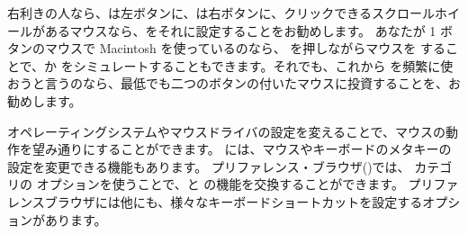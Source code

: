 \documentclass[a4paper,10pt,twoside]{book}
\begin{document}





右利きの人なら、\click は左ボタンに、\actclick は右ボタンに、クリックできるスクロールホイールがあるマウスなら、\metaclick をそれに設定することをお勧めします。
あなたが 1 ボタンのマウスで Macintosh を使っているのなら、\clover{} を押しながらマウスを \click することで、\actclick か \metaclick をシミュレートすることもできます。それでも、これから \pharo を頻繁に使おうと言うのなら、最低でも二つのボタンの付いたマウスに投資することを、お勧めします。

オペレーティングシステムやマウスドライバの設定を変えることで、マウスの動作を望み通りにすることができます。
\pharo には、マウスやキーボードのメタキーの設定を変更できる機能もあります。
プリファレンス・ブラウザ()では、 カテゴリの  オプションを使うことで、\actclick と \metaclick の機能を交換することができます。
プリファレンスブラウザには他にも、様々なキーボードショートカットを設定するオプションがあります。
\end{document}
